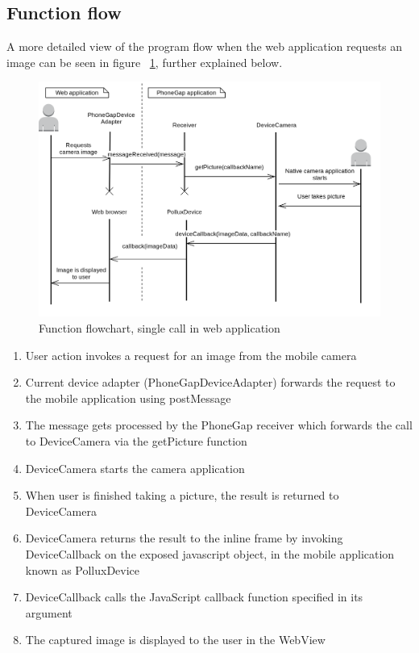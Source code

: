 \subsection{Function flow}\label{subsec:function-flow-phonegap}
A more detailed view of the program flow when the web application requests an image can be seen in figure ~\ref{fig:phonegapflow}, further explained below.
\begin{figure}[h!]
	\centering
    \includegraphics[width=120mm,natwidth=800,natheight=600]{./img/phonegapfunctionflow.png}
    \caption{Function flowchart, single call in web application} \label{fig:phonegapflow}
\end{figure}
\begin{enumerate}
	\item User action invokes a request for an image from the mobile camera 
	\item Current device adapter (PhoneGapDeviceAdapter) forwards the request to the mobile application using postMessage
	\item The message gets processed by the PhoneGap receiver which forwards the call to DeviceCamera via the getPicture function
	\item DeviceCamera starts the camera application
	\item When user is finished taking a picture, the result is returned to DeviceCamera
	\item DeviceCamera returns the result to the inline frame by invoking DeviceCallback on the exposed javascript object, in the mobile application known as PolluxDevice
	\item DeviceCallback calls the JavaScript callback function specified in its argument
	\item The captured image is displayed to the user in the WebView
\end{enumerate}



